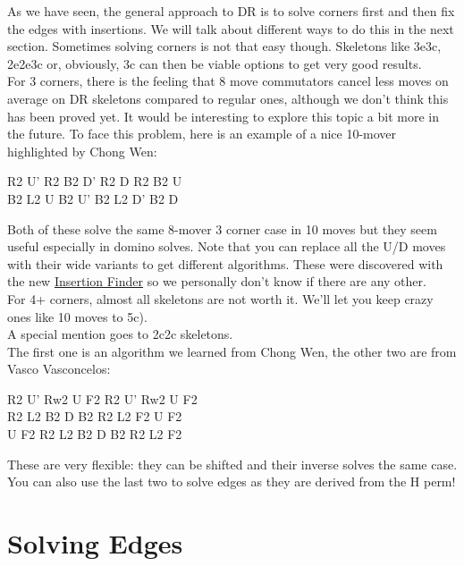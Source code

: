 \documentclass[11pt,a4paper]{book}
\begin{document}
As we have seen, the general approach to DR is to solve corners first and then fix the edges with insertions. We will talk about different ways to do this in the next section. Sometimes solving corners is not that easy though. Skeletons like 3e3c, 2e2e3c or, obviously, 3c can then be viable options to get very good results.\\
For 3 corners, there is the feeling that 8 move commutators cancel less moves on average on DR skeletons compared to regular ones, although we don't think this has been proved yet. It would be interesting to explore this topic a bit more in the future. To face this problem, here is an example of a nice 10-mover highlighted by Chong Wen:\\
\begin{center}
R2 U’ R2 B2 D’ R2 D R2 B2 U\\
B2 L2 U B2 U’ B2 L2 D’ B2 D\\
\end{center}
\bigskip
Both of these solve the same 8-mover 3 corner case in 10 moves but they seem useful especially in domino solves. Note that you can replace all the U/D moves with their wide variants to get different algorithms. These were discovered with the new  \href{https://fewestmov.es/if}{Insertion Finder} so we personally don't know if there are any other.\\
For 4+ corners, almost all skeletons are not worth it. We'll let you keep crazy ones like 10 moves to 5c). \\
A special mention goes to 2c2c skeletons. \\
The first one is an algorithm we learned from Chong Wen, the other two are from Vasco Vasconcelos:
\begin{center}
R2 U' Rw2 U F2 R2 U' Rw2 U F2 \\
 R2 L2 B2 D B2 R2 L2 F2 U F2\\
 U F2 R2 L2 B2 D B2 R2 L2 F2\\
\end{center}
These are very flexible: they can be shifted and their inverse solves the same case. You can also use the last two to solve edges as they are derived from the H perm! \\

\section{Solving Edges}
\end{document}
